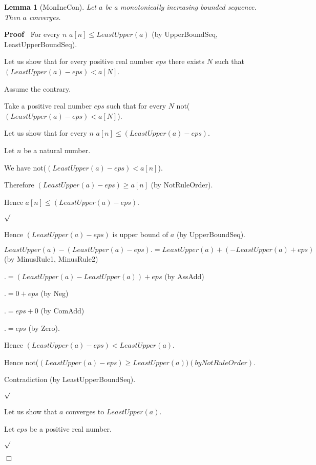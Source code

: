 \documentclass{article}
\newenvironment{forthel}{\begin{leftbar}}{\end{leftbar}}
\newenvironment{proof}{\noindent\textbf{Proof\ }}{\hspace*{\fill}$\Box$\medskip}
\newenvironment{subproof}{\begin{list}{}{}
		\item[\text{Proof}]}{\hfill $\surd$ \end{list}}
\newtheorem{lemma}{Lemma}
\begin{document}
\begin{forthel}
	\begin{lemma}[MonIncCon]
		Let $a$ be a monotonically increasing bounded sequence. Then $a$ converges.
	\end{lemma}
	
	\begin{proof}
		For every $n$ $a[n] \leq LeastUpper(a)$ (by UpperBoundSeq, LeastUpperBoundSeq).
		
		Let us show that for every positive real number $eps$ there exists $N$ such that $(LeastUpper(a) - eps) < a[N]$.
		
		\begin{subproof}
			Assume the contrary.
			
			Take a positive real number $eps$ such that for every $N$ not($(LeastUpper(a) - eps) < a[N]$).
			
			Let us show that for every $n$ $a[n] \leq (LeastUpper(a) - eps)$.
			
			\begin{subproof}
				Let $n$ be a natural number.
				
				We have not($(LeastUpper(a) - eps) < a[n]$).
				
				Therefore $(LeastUpper(a) - eps) \geq a[n]$ (by NotRuleOrder).
				
				Hence $a[n] \leq (LeastUpper(a) - eps)$.
				
			\end{subproof}
			
			Hence $(LeastUpper(a) - eps)$ is upper bound of $a$ (by UpperBoundSeq).
			
			$LeastUpper(a) - (LeastUpper(a) - eps) .= LeastUpper(a) + (-LeastUpper(a) + eps)$ (by MinusRule1, MinusRule2)
			
			$.= (LeastUpper(a) - LeastUpper(a)) + eps$ (by AssAdd)
			
			$.= 0 + eps$ (by Neg)
			
			$.= eps + 0$ (by ComAdd)
			
			$.= eps$ (by Zero).
			
			Hence $(LeastUpper(a) - eps) < LeastUpper(a)$.
			
			Hence not($(LeastUpper(a) - eps) \geq LeastUpper(a)) (by NotRuleOrder)$.
			
			Contradiction (by LeastUpperBoundSeq).
			
		\end{subproof}
		
		Let us show that $a$ converges to $LeastUpper(a)$.
		
		\begin{subproof}
			Let $eps$ be a positive real number.
			

\end{subproof}
\end{proof}
\end{forthel}
\end{document}
